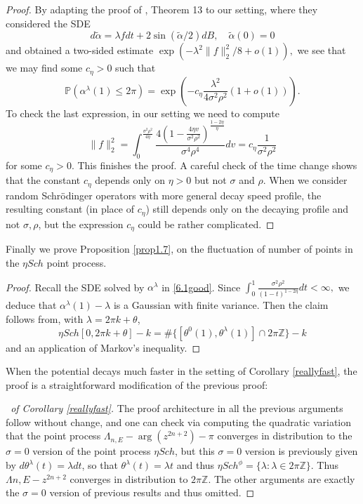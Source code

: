 \documentclass[12pt, reqno]{amsart}
\theoremstyle{definition}
\theoremstyle{remark}
\numberwithin{equation}{section}
\begin{document}
\begin{proof}
By adapting the proof of \cite{valko2009continuum}, Theorem 13 to our setting, where they considered the SDE $$d\tilde{\alpha}=\lambda fdt+2\sin(\tilde{\alpha}/2)dB,\quad\tilde{\alpha}(0)=0$$
and obtained a two-sided estimate $\exp(-\lambda^2\|f\|_2^2/8+o(1)),$
we see that we may find some $c_\eta>0$ such that 
$$\mathbb{P}(\alpha^\lambda(1)\leq 2\pi)=\exp(-c_\eta\frac{\lambda^2}{{4\sigma^2\rho^2}}(1+o(1))).$$
To check the last expression, in our setting we need to compute 
$$\|f\|_2^2=
\int_0^\frac{\sigma^2\rho^2}{4\eta}\frac{4(1-\frac{4\eta v}{\sigma^2\rho^2})^\frac{1-2\eta}{\eta}}{\sigma^4\rho^4}dv=c_\eta\frac{1}{\sigma^2\rho^2}
$$ for some $c_\eta>0$. This finishes the proof. A careful check of the time change shows that the constant $c_\eta$ depends only on $\eta>0$ but not $\sigma$ and $\rho$. When we consider random Schrödinger operators with more general decay speed profile, the resulting constant (in place of $c_\eta$) still depends only on the decaying profile and not $\sigma,\rho$, but the expression $c_\eta$ could be rather complicated.  

\end{proof}


Finally we prove Proposition \ref{prop1.7}, on the fluctuation of number of points in the $\eta Sch$ point process.


\begin{proof}
Recall the SDE solved by $\alpha^\lambda$ in \eqref{6.1good}. Since $\int_0^1 \frac{\sigma^2\rho^2}{(1-t)^{1-2\eta}}dt<\infty,$ we deduce that $\alpha^\lambda(1)-\lambda$ is a Gaussian with finite variance. Then the claim follows from, with $\lambda=2\pi k+\theta$, 
$$ \eta Sch[0,2\pi k+\theta]-k=\#\{[\theta^0(1),\theta^\lambda(1)]\cap 2\pi\mathbb{Z}\}-k $$
and an application of Markov's inequality.
\end{proof}


When the potential decays much faster in the setting of Corollary \ref{reallyfast}, the proof is a straightforward modification of the previous proof:

\begin{proof}[\proofname\ of Corollary \ref{reallyfast}]The proof architecture in all the previous arguments follow without change, and one can check via computing the quadratic variation that the point process $\Lambda_{n,E}-\arg(z^{2n+2})-\pi$ converges in distribution to the $\sigma=0$ version of the point process $\eta Sch$, but this $\sigma=0$ version is previously given by $d\theta^\lambda(t)=\lambda dt$, so that $\theta^\lambda(t)=\lambda t$ and thus $\eta Sch^\phi=\{\lambda:\lambda\in 2\pi\mathbb{Z}\}$. Thus $\Lambda{n,E}-z^{2n+2}$ converges in distribution to $2\pi\mathbb{Z}$. The other arguments are exactly the $\sigma=0$ version of previous results and thus omitted.
    
\end{proof}
\end{document}
